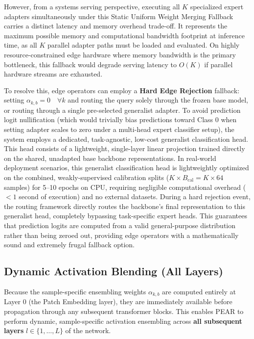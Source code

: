 However, from a systems serving perspective, executing all $K$ specialized expert adapters simultaneously under this Static Uniform Weight Merging Fallback carries a distinct latency and memory overhead trade-off. It represents the maximum possible memory and computational bandwidth footprint at inference time, as all $K$ parallel adapter paths must be loaded and evaluated. On highly resource-constrained edge hardware where memory bandwidth is the primary bottleneck, this fallback would degrade serving latency to $O(K)$ if parallel hardware streams are exhausted.

To resolve this, edge operators can employ a \textbf{Hard Edge Rejection} fallback: setting $\alpha_{k, b} = 0 \quad \forall k$ and routing the query solely through the frozen base model, or routing through a single pre-selected generalist adapter. To avoid prediction logit nullification (which would trivially bias predictions toward Class 0 when setting adapter scales to zero under a multi-head expert classifier setup), the system employs a dedicated, task-agnostic, low-cost generalist classification head. This head consists of a lightweight, single-layer linear projection trained directly on the shared, unadapted base backbone representations. In real-world deployment scenarios, this generalist classification head is lightweightly optimized on the combined, weakly-supervised calibration splits ($K \times B_{\text{cal}} = K \times 64$ samples) for 5--10 epochs on CPU, requiring negligible computational overhead ($<1$ second of execution) and no external datasets. During a hard rejection event, the routing framework directly routes the backbone's final representation to this generalist head, completely bypassing task-specific expert heads. This guarantees that prediction logits are computed from a valid general-purpose distribution rather than being zeroed out, providing edge operators with a mathematically sound and extremely frugal fallback option.

\subsection{Dynamic Activation Blending (All Layers)}
Because the sample-specific ensembling weights $\alpha_{k, b}$ are computed entirely at Layer 0 (the Patch Embedding layer), they are immediately available before propagation through any subsequent transformer blocks. This enables PEAR to perform dynamic, sample-specific activation ensembling across \textbf{all subsequent layers} $l \in \{1, \dots, L\}$ of the network.

